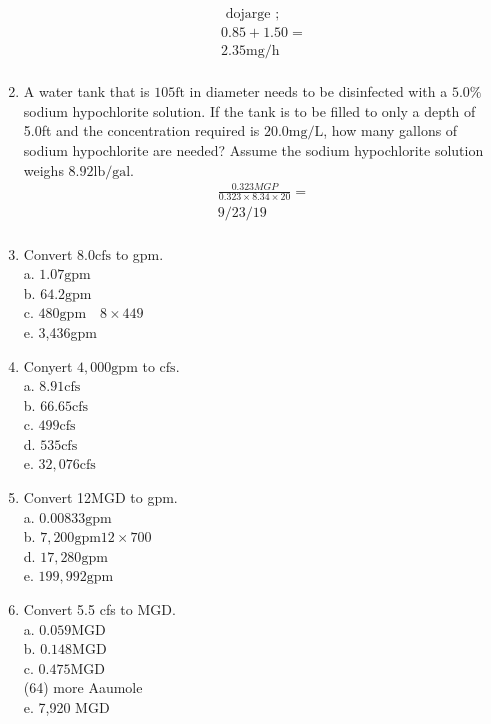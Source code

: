 \begin{enumerate}
$$\begin{gathered}
\text { dojarge } ; \\
0.85+1.50= \\
2.35 \mathrm{mg} / \mathrm{h}\\
\end{gathered}
$$
\item A water tank that is $105 \mathrm{ft}$ in diameter needs to be disinfected with a $5.0 \%$ sodium hypochlorite solution. If the tank is to be filled to only a depth of 5.0ft and the concentration required is $20.0 \mathrm{mg} / \mathrm{L}$, how many gallons of sodium hypochlorite are needed? Assume the sodium hypochlorite solution weighs $8.92 \mathrm{lb} / \mathrm{gal}$.\\
$$
\begin{gathered}
\frac{0.323 M G P}{0.323 \times 8.34 \times 20}= \\
9 / 23 / 19\\
\end{gathered}
$$
\item Convert $8.0 \mathrm{cfs}$ to gpm.\\
a. $1.07 \mathrm{gpm}$\\
b. $64.2 \mathrm{gpm}$\\
c. $480 \mathrm{gpm} \quad 8 \times 449$\\
e. 3,436gpm\\
\item Conyert $4,000 \mathrm{gpm}$ to $\mathrm{cfs}$.\\
a. $8.91 \mathrm{cfs}$\\
b. $66.65 \mathrm{cfs}$\\
c. $499 \mathrm{cfs}$\\
d. $535 \mathrm{cfs}$\\
e. $32,076 \mathrm{cfs}$\\
\item Convert 12MGD to gpm.\\
a. $0.00833 \mathrm{gpm}$\\
b. $7,200 \mathrm{gpm} 12 \times 700$\\
d. $17,280 \mathrm{gpm}$\\
e. $199,992 \mathrm{gpm}$\\
\item Convert 5.5 cfs to MGD.\\
a. $0.059 \mathrm{MGD}$\\
b. $0.148 \mathrm{MGD}$\\
c. $0.475 \mathrm{MGD}$\\
(64) more Aaumole\\
e. 7,920 MGD\\

\end{enumerate}
